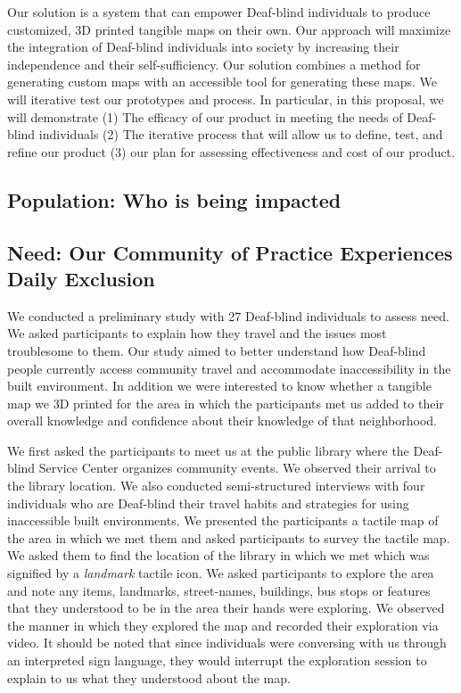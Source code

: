 Our solution is a system that can empower Deaf-blind individuals to produce  customized, 3D printed tangible maps on their own. Our approach will maximize the integration of Deaf-blind individuals into society by increasing their independence and their self-sufficiency. Our solution combines a method for generating custom maps with an accessible tool for generating these maps. We will iterative test our prototypes and process. In particular, in this proposal, we will demonstrate (1) The efficacy of our product in meeting the needs of Deaf-blind individuals (2)  The iterative process that will allow us to define, test, and refine our product (3) our plan for assessing effectiveness and cost of our product. 

\subsection{Population: Who is being impacted}

\subsection{Need: Our Community of Practice Experiences Daily Exclusion}

We conducted a  preliminary study with 27 Deaf-blind individuals to assess need. We asked participants to explain how they travel and the issues most troublesome to them. 
Our study aimed to better understand how Deaf-blind people currently access community travel and 
accommodate inaccessibility in the built environment. In addition we were interested to know whether a tangible map we 3D printed for the area in which the participants met us added to their overall knowledge and confidence about their knowledge of that neighborhood.

We first asked the participants to meet us at the public library where the Deaf-blind Service Center organizes community events. 
We observed their arrival to the library location. We also conducted semi-structured interviews with four individuals who are Deaf-blind their travel habits and strategies for using inaccessible built environments. 
We presented the participants a tactile map of the area in which we met them and asked participants to survey the tactile map. We asked them to find the location of the library in which we met which was signified by a \textit{landmark} tactile icon. We asked participants to explore the area and note any items, landmarks, street-names, buildings, bus stops or features that they understood to be in the area their hands were exploring. We observed the manner in which they explored the map and recorded their exploration via video. It should be noted that since individuals were conversing with us through an interpreted sign language, they would interrupt the exploration session to explain to us what they understood about the map.

